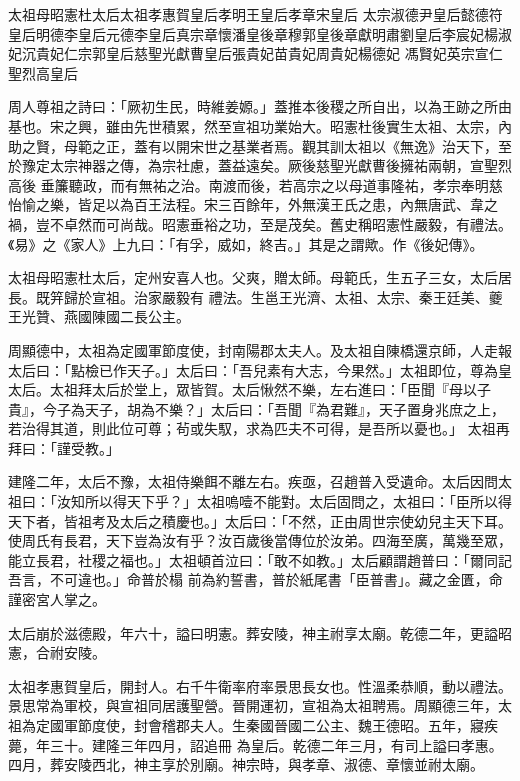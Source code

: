 
\begin{pinyinscope}

 太祖母昭憲杜太后太祖孝惠賀皇后孝明王皇后孝章宋皇后
 太宗淑德尹皇后懿德符皇后明德李皇后元德李皇后真宗章懷潘皇後章穆郭皇後章獻明肅劉皇后李宸妃楊淑妃沉貴妃仁宗郭皇后慈聖光獻曹皇后張貴妃苗貴妃周貴妃楊德妃
 馮賢妃英宗宣仁聖烈高皇后



 周人尊祖之詩曰：「厥初生民，時維姜嫄。」蓋推本後稷之所自出，以為王跡之所由基也。宋之興，雖由先世積累，然至宣祖功業始大。昭憲杜後實生太祖、太宗，內助之賢，母範之正，蓋有以開宋世之基業者焉。觀其訓太祖以《無逸》治天下，至於豫定太宗神器之傳，為宗社慮，蓋益遠矣。厥後慈聖光獻曹後擁祐兩朝，宣聖烈高後
 垂簾聽政，而有無祐之治。南渡而後，若高宗之以母道事隆祐，孝宗奉明慈怡愉之樂，皆足以為百王法程。宋三百餘年，外無漢王氏之患，內無唐武、韋之禍，豈不卓然而可尚哉。昭憲垂裕之功，至是茂矣。舊史稱昭憲性嚴毅，有禮法。《易》之《家人》上九曰：「有孚，威如，終吉。」其是之謂歟。作《後妃傳》。



 太祖母昭憲杜太后，定州安喜人也。父爽，贈太師。母範氏，生五子三女，太后居長。既笄歸於宣祖。治家嚴毅有
 禮法。生邕王光濟、太祖、太宗、秦王廷美、夔王光贊、燕國陳國二長公主。



 周顯德中，太祖為定國軍節度使，封南陽郡太夫人。及太祖自陳橋還京師，人走報太后曰：「點檢已作天子。」太后曰：「吾兒素有大志，今果然。」太祖即位，尊為皇太后。太祖拜太后於堂上，眾皆賀。太后愀然不樂，左右進曰：「臣聞『母以子貴』，今子為天子，胡為不樂？」太后曰：「吾聞『為君難』，天子置身兆庶之上，若治得其道，則此位可尊；茍或失馭，求為匹夫不可得，是吾所以憂也。」
 太祖再拜曰：「謹受教。」



 建隆二年，太后不豫，太祖侍樂餌不離左右。疾亟，召趙普入受遺命。太后因問太祖曰：「汝知所以得天下乎？」太祖嗚噎不能對。太后固問之，太祖曰：「臣所以得天下者，皆祖考及太后之積慶也。」太后曰：「不然，正由周世宗使幼兒主天下耳。使周氏有長君，天下豈為汝有乎？汝百歲後當傳位於汝弟。四海至廣，萬幾至眾，能立長君，社稷之福也。」太祖頓首泣曰：「敢不如教。」太后顧謂趙普曰：「爾同記吾言，不可違也。」命普於榻
 前為約誓書，普於紙尾書「臣普書」。藏之金匱，命謹密宮人掌之。



 太后崩於滋德殿，年六十，謚曰明憲。葬安陵，神主祔享太廟。乾德二年，更謚昭憲，合祔安陵。



 太祖孝惠賀皇后，開封人。右千牛衛率府率景思長女也。性溫柔恭順，動以禮法。景思常為軍校，與宣祖同居護聖營。晉開運初，宣祖為太祖聘焉。周顯德三年，太祖為定國軍節度使，封會稽郡夫人。生秦國晉國二公主、魏王德昭。五年，寢疾薨，年三十。建隆三年四月，詔追冊
 為皇后。乾德二年三月，有司上謚曰孝惠。四月，葬安陵西北，神主享於別廟。神宗時，與孝章、淑德、章懷並祔太廟。




\end{pinyinscope}
